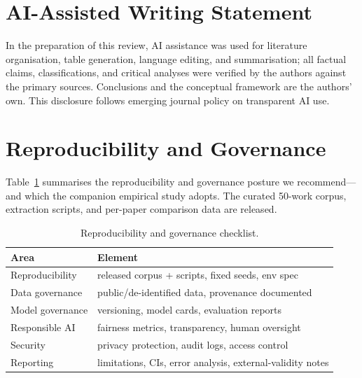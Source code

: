 \section{AI-Assisted Writing Statement}
In the preparation of this review, AI assistance was used for literature organisation, table generation, language editing, and summarisation; all factual claims, classifications, and critical analyses were verified by the authors against the primary sources. Conclusions and the conceptual framework are the authors' own. This disclosure follows emerging journal policy on transparent AI use.

\section{Reproducibility and Governance}
Table~\ref{tab:repgov} summarises the reproducibility and governance posture we recommend---and which the companion empirical study adopts. The curated 50-work corpus, extraction scripts, and per-paper comparison data are released.
\begin{table}[t]\centering\caption{Reproducibility and governance checklist.}\label{tab:repgov}
\footnotesize\begin{tabular}{ll}\toprule
Area & Element\\\midrule
Reproducibility & released corpus + scripts, fixed seeds, env spec\\
Data governance & public/de-identified data, provenance documented\\
Model governance & versioning, model cards, evaluation reports\\
Responsible AI & fairness metrics, transparency, human oversight\\
Security & privacy protection, audit logs, access control\\
Reporting & limitations, CIs, error analysis, external-validity notes\\\bottomrule
\end{tabular}\end{table}

